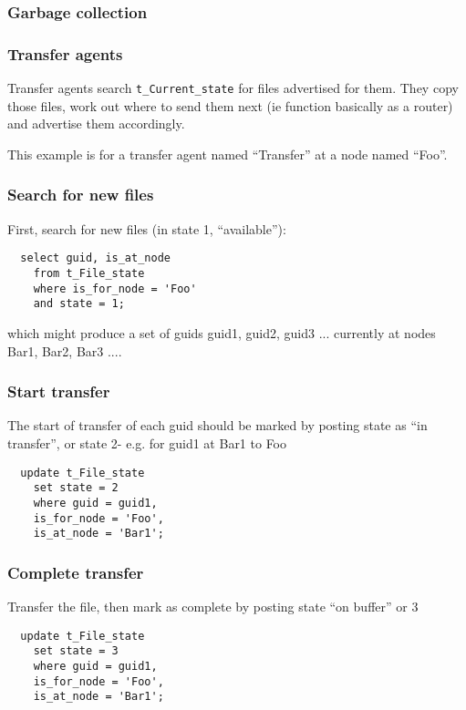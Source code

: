 \documentclass{cmspaper}
\begin{document}
\subsubsection{Garbage collection}

\subsubsection{Transfer agents}

Transfer agents search \texttt{t\_Current\_state} for files advertised for them.  They copy those files, work out where to send them next (ie function basically as a router) and advertise them accordingly. 

This example is for a transfer agent named ``Transfer'' at a node named ``Foo''.

\subsubsection{Search for new files}
First, search for new files (in state 1, ``available''):

{\small\begin{verbatim}
  select guid, is_at_node
    from t_File_state
    where is_for_node = 'Foo'
    and state = 1;
\end{verbatim}}

which might produce a set of guids {guid1, guid2, guid3 ...} currently at nodes {Bar1, Bar2, Bar3 ...}. 

\subsubsection{Start transfer}
The start of transfer of each guid should be marked by posting state as ``in transfer'', or state 2- e.g. for guid1 at Bar1 to Foo

{\small\begin{verbatim}
  update t_File_state
    set state = 2
    where guid = guid1,
    is_for_node = 'Foo',
    is_at_node = 'Bar1';
  \end{verbatim}}

\subsubsection{Complete transfer}
Transfer the file, then mark as complete by posting state ``on buffer'' or 3

{\small\begin{verbatim}
  update t_File_state
    set state = 3
    where guid = guid1,
    is_for_node = 'Foo',
    is_at_node = 'Bar1';
\end{verbatim}}
\end{document}
